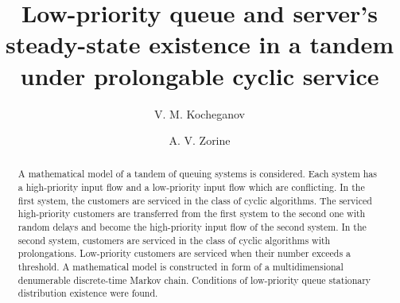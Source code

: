 \documentclass[60x84/16,10pt]{dccn}
\begin{document}
{


\title{Low-priority queue and server's steady-state existence in a tandem under prolongable cyclic service}

\author[1,2]{V. M. Kocheganov}
\author[1]{A. V. Zorine}

\address[1]{Department of Applied Probability Theory\\ N.~I.~Lobachevsky State University of Nizhni Novgorod\\ Gagarina av. 23, 603950 Nizhny Novgorod, Russia}
\address[2]{Department of Applied Probability Theory\\ N.~I.~Lobachevsky State University of Nizhni Novgorod\\ Gagarina av. 23, 603950 Nizhny Novgorod, Russia}

\begin{abstract}
A mathematical model of a tandem of queuing systems is considered. Each system has a high-priority input flow and a low-priority input flow which are conflicting. In the first system, the customers are serviced in the class of cyclic algorithms. The serviced high-priority customers are transferred from the first system to the second one  with random delays and become the high-priority input flow of the second system. In the second system, customers are serviced in the class of cyclic algorithms with prolongations. Low-priority customers are serviced when their number exceeds a threshold. A mathematical model is constructed in form of a multidimensional denumerable discrete-time Markov chain. Conditions of low-priority queue stationary distribution existence were found.
\end{abstract}




%
%
%
%

}
\end{document}
